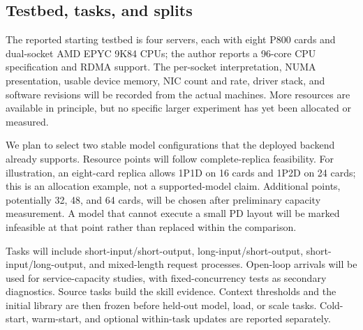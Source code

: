 \documentclass[11pt,a4paper]{article}
\begin{document}
\subsection{Testbed, tasks, and splits}
The reported starting testbed is four servers, each with eight P800 cards and dual-socket AMD EPYC 9K84 CPUs; the author reports a 96-core CPU specification and RDMA support. The per-socket interpretation, NUMA presentation, usable device memory, NIC count and rate, driver stack, and software revisions will be recorded from the actual machines. More resources are available in principle, but no specific larger experiment has yet been allocated or measured.

We plan to select two stable model configurations that the deployed backend already supports. Resource points will follow complete-replica feasibility. For illustration, an eight-card replica allows 1P1D on 16 cards and 1P2D on 24 cards; this is an allocation example, not a supported-model claim. Additional points, potentially 32, 48, and 64 cards, will be chosen after preliminary capacity measurement. A model that cannot execute a small PD layout will be marked infeasible at that point rather than replaced within the comparison.

Tasks will include short-input/short-output, long-input/short-output, short-input/long-output, and mixed-length request processes. Open-loop arrivals will be used for service-capacity studies, with fixed-concurrency tests as secondary diagnostics. Source tasks build the skill evidence. Context thresholds and the initial library are then frozen before held-out model, load, or scale tasks. Cold-start, warm-start, and optional within-task updates are reported separately.
\end{document}
